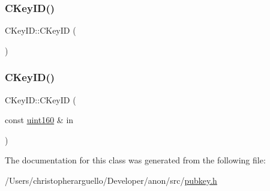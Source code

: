 \subsubsection{\texorpdfstring{C\+Key\+I\+D()}{CKeyID()}\hspace{0.1cm}{\footnotesize\ttfamily [1/2]}}
{\footnotesize\ttfamily C\+Key\+I\+D\+::\+C\+Key\+ID (\begin{DoxyParamCaption}{ }\end{DoxyParamCaption})\hspace{0.3cm}{\ttfamily [inline]}}

\mbox{\label{class_c_key_i_d_a695f373e11730318f9103100fa006a7e}} 
\subsubsection{\texorpdfstring{C\+Key\+I\+D()}{CKeyID()}\hspace{0.1cm}{\footnotesize\ttfamily [2/2]}}
{\footnotesize\ttfamily C\+Key\+I\+D\+::\+C\+Key\+ID (\begin{DoxyParamCaption}\item[{const \mbox{\hyperlink{classuint160}{uint160}} \&}]{in }\end{DoxyParamCaption})\hspace{0.3cm}{\ttfamily [inline]}}



The documentation for this class was generated from the following file\+:\begin{DoxyCompactItemize}
\item 
/\+Users/christopherarguello/\+Developer/anon/src/\mbox{\hyperlink{pubkey_8h}{pubkey.\+h}}\end{DoxyCompactItemize}
